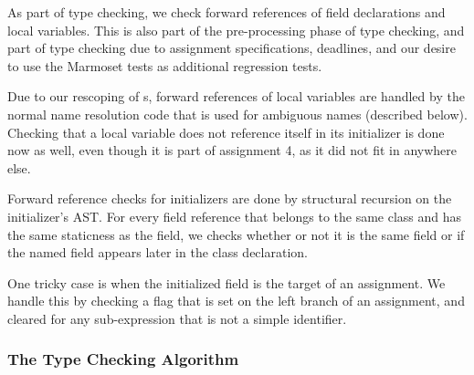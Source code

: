 \documentclass[pdftex,11pt,a4paper]{article}
\begin{document}
As part of type checking, we check forward references of field
declarations and local variables. This is also part of the
pre-processing phase of type checking, and part of type checking
due to assignment specifications, deadlines, and our desire to use the
Marmoset tests as additional regression tests.

Due to our rescoping of s, forward references of local
variables are handled by the normal name resolution code that is used
for ambiguous names (described below). Checking that a local variable
does not reference itself in its initializer is done now as well, even though
it is part of assignment 4, as it did not fit in anywhere else.

Forward reference checks for  initializers are done by
structural recursion on the  initializer's AST. For every
field reference that belongs to the same class and has the same
staticness as the field, we checks whether or not it is the same field
or if the named field appears later in the class declaration.

One tricky case is when the initialized field is the target of an
assignment. We handle this by checking a flag that is set on the left
branch of an assignment, and cleared for any sub-expression that is
not a simple identifier.

\subsubsection{The Type Checking Algorithm}
\end{document}
